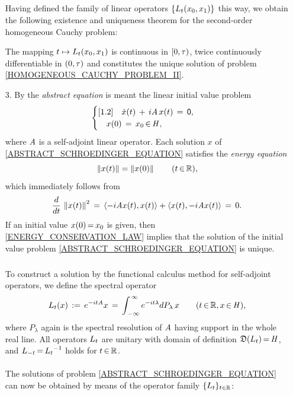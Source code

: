 \documentclass[11pt,twoside]{article}
\begin{document}
\begin{itemize}[leftmargin=12pt,itemsep=2mm,topsep=1mm]
\subparagraph{} %
Having defined the family of linear operators $\{\linL_t(x_0,x_1)\}$ this way,
we obtain the following existence and uniqueness theorem
for the second-order homogeneous Cauchy problem:

\begin{theorem}
The mapping $t \mapsto \linL_t(x_0,x_1)$ is continuous in $[0,\T)$,
twice continuously differentiable in $(0,\T)$ and
constitutes the unique solution
of problem \eqref{HOMOGENEOUS_CAUCHY_PROBLEM_II}.
\end{theorem}

\item[3.]
By the \textit{abstract {\SCHROEDINGER} equation} is meant
the linear initial value problem
\begin{equation}\label{ABSTRACT_SCHROEDINGER_EQUATION}
\begin{cases}[1.2]
\quad \dot{x}(t) \, + \, i \mathit{A} \, x(t) \,=\, {\mathsf{0}},\\
\quad x(0) \,=\, x_0 {\,\in\,} \mathit{H},\\
\end{cases}
\end{equation}
where $\mathit{A}$ is a self-adjoint linear operator.
Each solution $x$ of \eqref{ABSTRACT_SCHROEDINGER_EQUATION}
satisfies the \textit{energy equation}
\begin{equation}\label{ENERGY_CONSERVATION_LAW}
\left\lVert x(t) \right\rVert = \left\lVert x(0) \right\rVert
\quad \quad (t {\,\in\,} {\mathbb{R}}),
\end{equation}
which immediately follows from
\[
\frac{d}{dt} \, \left\lVert x(t) \right\rVert^2
\,=\,
\langle -i\mathit{A} x(t),x(t) \rangle + \langle x(t),-i \mathit{A} x(t) \rangle \,=\, 0.
\]
If an initial value $x(0) {\,=\,} x_0$ is given,
then \eqref{ENERGY_CONSERVATION_LAW} implies
that the solution of the initial value problem 
\eqref{ABSTRACT_SCHROEDINGER_EQUATION} is unique.

\subparagraph{} %
To construct a solution
by the functional calculus method for self-adjoint operators,
we define the spectral operator
\[
{L}_t(x) 
\,:=\,
e^{-it \mathit{A}} x
\,=\,
\int_{\,-\infty}^{\,\infty} e^{-it \lambda} dP_{\lambda} \, x
\quad \quad (t {\,\in\,} {\mathbb{R}}, x {\,\in\,} \mathit{H}),
\]
where $P_{\lambda}$ again is the spectral resolution of $\mathit{A}$
having support in the whole real line.
All operators ${L}_t$ are unitary
with domain of definition $\mathfrak{D}({L}_t) {\,=\,} \mathit{H}$,
and ${L}_{-t} {\,=\,} {{L}_t}^{-1}$ holds for $t {\,\in\,} {\mathbb{R}}$.

\paragraph{} %
The solutions of problem \eqref{ABSTRACT_SCHROEDINGER_EQUATION}
can now be obtained by means of the operator family $\{L_t\}_{t \in {\mathbb{R}}}$:


\end{itemize}
\end{document}
